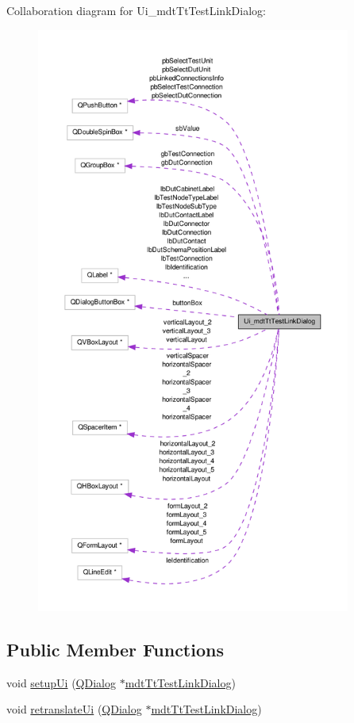 Collaboration diagram for Ui\-\_\-mdt\-Tt\-Test\-Link\-Dialog\-:
\nopagebreak
\begin{figure}[H]
\begin{center}
\leavevmode
\includegraphics[height=550pt]{class_ui__mdt_tt_test_link_dialog__coll__graph}
\end{center}
\end{figure}
\subsection*{Public Member Functions}
\begin{DoxyCompactItemize}
\item 
void \hyperlink{class_ui__mdt_tt_test_link_dialog_ae3ddc348478c06deed430a1ce21376ed}{setup\-Ui} (\hyperlink{class_q_dialog}{Q\-Dialog} $\ast$\hyperlink{classmdt_tt_test_link_dialog}{mdt\-Tt\-Test\-Link\-Dialog})
\item 
void \hyperlink{class_ui__mdt_tt_test_link_dialog_a59bbb8972f3732033838dd99884d8694}{retranslate\-Ui} (\hyperlink{class_q_dialog}{Q\-Dialog} $\ast$\hyperlink{classmdt_tt_test_link_dialog}{mdt\-Tt\-Test\-Link\-Dialog})
\end{DoxyCompactItemize}
